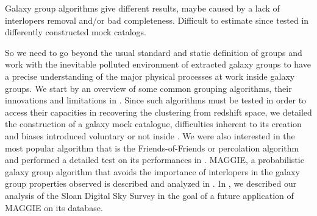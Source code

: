 Galaxy group algorithms give different results, maybe caused by a lack of
interlopers removal and/or bad completeness. Difficult to estimate since tested
in differently constructed mock catalogs. 

So we need to go beyond the usual standard and static definition of groups and
work with the inevitable polluted environment of extracted galaxy groups to
have a precise understanding of the major physical processes at work inside
galaxy groups. We start by an overview of some common grouping algorithms,
their innovations and limitations in .
Since such algorithms must be tested in order to access their capacities in
recovering the clustering from redshift space, we detailed the construction of
a galaxy mock catalogue, difficulties inherent to its creation and biases
introduced voluntary or not inside . We were also
interested in the most popular algorithm that is the Friends-of-Friends or
percolation algorithm and performed a detailed test on its performances in
. MAGGIE, a probabilistic galaxy
group algorithm that avoids the importance of interlopers in the galaxy group
properties observed is described and analyzed in . In
, we described our analysis of the Sloan Digital Sky
Survey in the goal of a future application of MAGGIE on its database.

